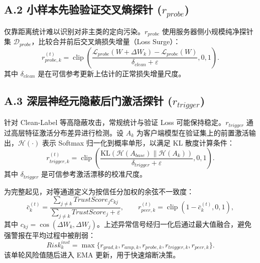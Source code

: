\documentclass[11pt, a4paper, UTF8, fontset=fandol]{ctexart}
\begin{document}
\subsection{A.2 小样本先验验证交叉熵探针 ($r_{probe}$)}
仅靠距离统计难以识别对非主类的定向污染。$r_{probe}$ 使用服务器侧小规模纯净探针集 $\mathcal{D}_{probe}$，比较合并前后交叉熵损失增量（Loss Surge）：
\begin{equation}
 r_{probe,k}^{(t)}=\operatorname{clip}\!\left(
 \frac{\mathcal{L}_{probe}(W+\Delta W_k)-\mathcal{L}_{probe}(W)}
 {\delta_{clean}+\varepsilon},0,1\right).
\end{equation}
其中 $\delta_{clean}$ 是在可信参考更新上估计的正常损失增量尺度。

\subsection{A.3 深层神经元隐蔽后门激活探针 ($r_{trigger}$)}
针对 Clean-Label 等高隐蔽攻击，常规统计与验证 Loss 可能保持稳定。$r_{trigger}$ 通过高层特征激活分布差异进行检测。设 $A_k$ 为客户端模型在验证集上的前置激活输出，$\mathcal{H}(\cdot)$ 表示 Softmax 归一化到概率单形，以满足 KL 散度计算条件：
\begin{equation}
 r_{trigger,k}^{(t)}=\operatorname{clip}\!\left(
 \frac{\mathrm{KL}(\mathcal{H}(A_{base})\|\mathcal{H}(A_k))}
 {\delta_{trigger}+\varepsilon},0,1\right).
\end{equation}
其中 $\delta_{trigger}$ 是可信参考激活漂移的校准尺度。

为完整起见，对等通道定义为按信任分加权的余弦不一致度：
\begin{equation}
 \bar c_k^{(t)}=\frac{\sum_{j\ne k}TrustScore_j c_{kj}}
 {\sum_{j\ne k}TrustScore_j+\varepsilon},\qquad
 r_{peer,k}^{(t)}=\operatorname{clip}(1-\bar c_k^{(t)},0,1),
\end{equation}
其中 $c_{kj}=\cos(\Delta W_k,\Delta W_j)$。上述异常信号经归一化后通过最大值融合，避免强警报在平均过程中被削弱：
\begin{equation}
 Risk_k^{inst}=\max\{r_{grad,k},r_{amp,k},r_{probe,k},r_{trigger,k},r_{peer,k}\}.
\end{equation}
该单轮风险值随后进入 EMA 更新，用于快速熔断决策。
\end{document}
